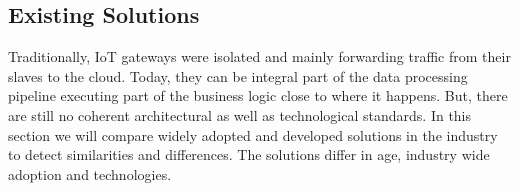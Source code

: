 \subsection{Existing Solutions} \label{sec:existingSolutions}

Traditionally, IoT gateways were isolated and mainly forwarding traffic from their slaves to the cloud. Today, they can be integral part of the data processing pipeline executing part of the business logic close to where it happens. But, there are still no coherent architectural as well as technological standards. In this section we will compare widely adopted and developed solutions in the industry to detect similarities and differences. The solutions differ in age, industry wide adoption and technologies.



